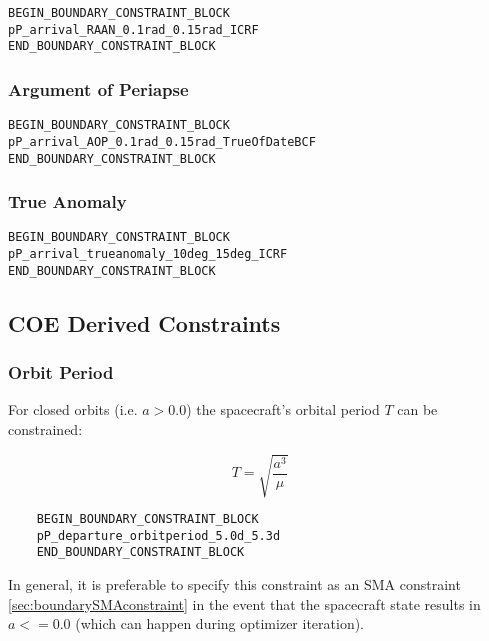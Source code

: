 \documentclass[11pt]{article}
\begin{document}
\begin{verbatim}
BEGIN_BOUNDARY_CONSTRAINT_BLOCK
pP_arrival_RAAN_0.1rad_0.15rad_ICRF
END_BOUNDARY_CONSTRAINT_BLOCK
\end{verbatim}

\subsubsection{Argument of Periapse}
\label{sec:boundaryAOPconstraint}

\begin{verbatim}
BEGIN_BOUNDARY_CONSTRAINT_BLOCK
pP_arrival_AOP_0.1rad_0.15rad_TrueOfDateBCF
END_BOUNDARY_CONSTRAINT_BLOCK
\end{verbatim}

\subsubsection{True Anomaly}
\label{sec:boundaryTAconstraint}

\begin{verbatim}
BEGIN_BOUNDARY_CONSTRAINT_BLOCK
pP_arrival_trueanomaly_10deg_15deg_ICRF
END_BOUNDARY_CONSTRAINT_BLOCK
\end{verbatim}

\subsection{COE Derived Constraints}
\label{sec:boundaryCOEderivedConstraints}

\subsubsection{Orbit Period}
\label{sec:boundaryOrbitPeriod}

For closed orbits (i.e. $a > 0.0$) the spacecraft's orbital period $T$ can be constrained:

\begin{equation}
	T = \sqrt{\frac{a^3}{\mu}}
\end{equation}

\begin{verbatim}
	BEGIN_BOUNDARY_CONSTRAINT_BLOCK
	pP_departure_orbitperiod_5.0d_5.3d
	END_BOUNDARY_CONSTRAINT_BLOCK
\end{verbatim}

In general, it is preferable to specify this constraint as an SMA constraint \ref{sec:boundarySMAconstraint} in the event that the spacecraft state results in $a <= 0.0$ (which can happen during optimizer iteration).
\end{document}
